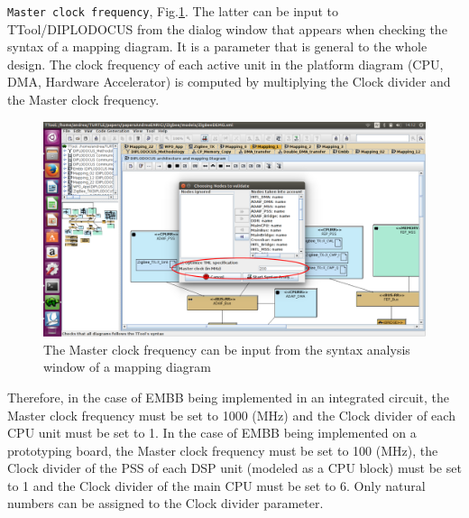 \documentclass{llncs}
\newcommand{\screenshotsize}{1.0\textwidth}
\begin{document}
\texttt{Master clock frequency}, Fig.\ref{fig:ClockFrequency}. The latter can be input to TTool/DIPLODOCUS from the
dialog window that appears when checking the syntax of a mapping diagram. It is a parameter that is general to the
whole design. The clock frequency of each active unit in the platform diagram (CPU, DMA, Hardware Accelerator) is
computed by multiplying the Clock divider and the Master clock frequency.
%
\begin{figure}[htbp]
	\centering
	\includegraphics[width=\screenshotsize]{figures/screenshot/ClockFrequency.pdf}
	\caption{The Master clock frequency can be input from the syntax analysis window of a mapping diagram}
	\label{fig:ClockFrequency}
\end{figure}
%
Therefore, in the case of EMBB being implemented in an integrated circuit, the Master clock frequency must be set to
1000 (MHz) and the Clock divider of each CPU unit must be set to 1. In the case of EMBB being implemented on a
prototyping board, the Master clock frequency must be set to 100 (MHz), the Clock divider of the PSS of each DSP unit
(modeled as a CPU block) must be set to 1 and the Clock divider of the main CPU must be set to 6. Only natural numbers can
be assigned to the Clock divider parameter.
%
%
%
\newpage
\end{document}

